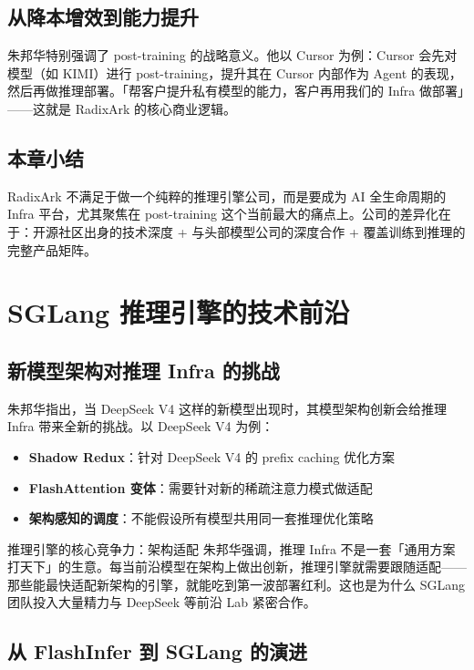 \documentclass[a4paper]{article}
\begin{document}
\subsection{从降本增效到能力提升}

朱邦华特别强调了 post-training 的战略意义。他以 Cursor 为例：Cursor 会先对模型（如 KIMI）进行 post-training，提升其在 Cursor 内部作为 Agent 的表现，然后再做推理部署。「帮客户提升私有模型的能力，客户再用我们的 Infra 做部署」——这就是 RadixArk 的核心商业逻辑。

\subsection{本章小结}
RadixArk 不满足于做一个纯粹的推理引擎公司，而是要成为 AI 全生命周期的 Infra 平台，尤其聚焦在 post-training 这个当前最大的痛点上。公司的差异化在于：开源社区出身的技术深度 + 与头部模型公司的深度合作 + 覆盖训练到推理的完整产品矩阵。

\section{SGLang 推理引擎的技术前沿}

\subsection{新模型架构对推理 Infra 的挑战}

朱邦华指出，当 DeepSeek V4 这样的新模型出现时，其模型架构创新会给推理 Infra 带来全新的挑战。以 DeepSeek V4 为例：

\begin{itemize}
\item \textbf{Shadow Redux}：针对 DeepSeek V4 的 prefix caching 优化方案
\item \textbf{FlashAttention 变体}：需要针对新的稀疏注意力模式做适配
\item \textbf{架构感知的调度}：不能假设所有模型共用同一套推理优化策略
\end{itemize}

\begin{importantbox}{推理引擎的核心竞争力：架构适配}
朱邦华强调，推理 Infra 不是一套「通用方案打天下」的生意。每当前沿模型在架构上做出创新，推理引擎就需要跟随适配——那些能最快适配新架构的引擎，就能吃到第一波部署红利。这也是为什么 SGLang 团队投入大量精力与 DeepSeek 等前沿 Lab 紧密合作。
\end{importantbox}

\subsection{从 FlashInfer 到 SGLang 的演进}
\end{document}

